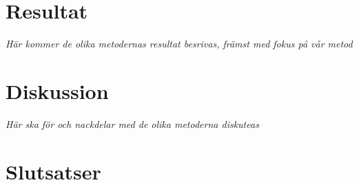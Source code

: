 \section{Resultat}
\emph{Här kommer de olika metodernas resultat besrivas, främst med fokus på vår metod}


\section{Diskussion}
\emph{Här ska för och nackdelar med de olika metoderna diskuteas}

\section{Slutsatser}





